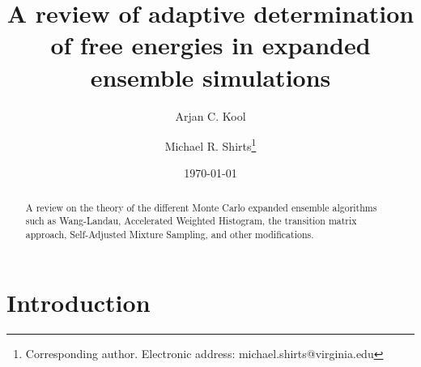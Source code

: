 \documentclass[superscriptaddress,showkeys, nofootinbib, pre, aps]{revtex4-1}
\begin{document}
\title{A review of adaptive determination of free energies in expanded ensemble simulations}%

\author{Arjan C. Kool}

\author{Michael R. Shirts\thanks{Corresponding author.  Electronic address: michael.shirts@virginia.edu}}%


\date{\today}%
\begin{abstract}

A review on the theory of the different Monte Carlo expanded ensemble algorithms such as Wang-Landau, Accelerated Weighted Histogram, the transition matrix approach, Self-Adjusted Mixture Sampling, and other modifications.
\end{abstract}
\maketitle

\section{\label{sec:intro}Introduction}

\end{document}
